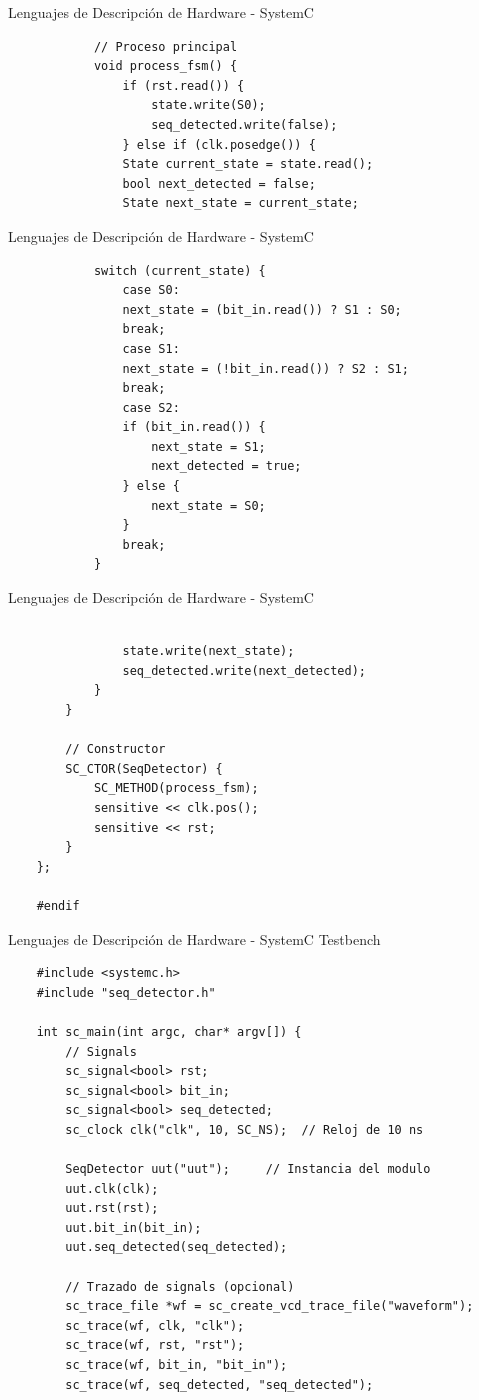 \documentclass[11pt]{beamer}
\begin{document}
	\begin{frame}[fragile]{Lenguajes de Descripción de Hardware - SystemC}
	\begin{lstlisting}
			// Proceso principal
			void process_fsm() {
				if (rst.read()) {
					state.write(S0);
					seq_detected.write(false);
				} else if (clk.posedge()) {
				State current_state = state.read();
				bool next_detected = false;
				State next_state = current_state;
	\end{lstlisting}
	\end{frame}
			
\begin{frame}[fragile]{Lenguajes de Descripción de Hardware - SystemC}
		\begin{lstlisting}
			switch (current_state) {
				case S0:
				next_state = (bit_in.read()) ? S1 : S0;
				break;
				case S1:
				next_state = (!bit_in.read()) ? S2 : S1;
				break;
				case S2:
				if (bit_in.read()) {
					next_state = S1;
					next_detected = true;
				} else {
					next_state = S0;
				}
				break;
			}
	\end{lstlisting}
\end{frame}
				
\begin{frame}[fragile]{Lenguajes de Descripción de Hardware - SystemC}
	\begin{lstlisting}
						
				state.write(next_state);
				seq_detected.write(next_detected);
			}
		}

		// Constructor
		SC_CTOR(SeqDetector) {
			SC_METHOD(process_fsm);
			sensitive << clk.pos();
			sensitive << rst;
		}
	};
		
	#endif
	\end{lstlisting}
\end{frame}

\begin{frame}[fragile]{Lenguajes de Descripción de Hardware - SystemC Testbench}
	\begin{lstlisting}
	#include <systemc.h>
	#include "seq_detector.h"
	
	int sc_main(int argc, char* argv[]) {
		// Signals
		sc_signal<bool> rst;
		sc_signal<bool> bit_in;
		sc_signal<bool> seq_detected;
		sc_clock clk("clk", 10, SC_NS);  // Reloj de 10 ns
		
		SeqDetector uut("uut");		// Instancia del modulo
		uut.clk(clk);
		uut.rst(rst);
		uut.bit_in(bit_in);
		uut.seq_detected(seq_detected);
		
		// Trazado de signals (opcional)
		sc_trace_file *wf = sc_create_vcd_trace_file("waveform");
		sc_trace(wf, clk, "clk");
		sc_trace(wf, rst, "rst");
		sc_trace(wf, bit_in, "bit_in");
		sc_trace(wf, seq_detected, "seq_detected");
	
	\end{lstlisting}
\end{frame}
\end{document}

